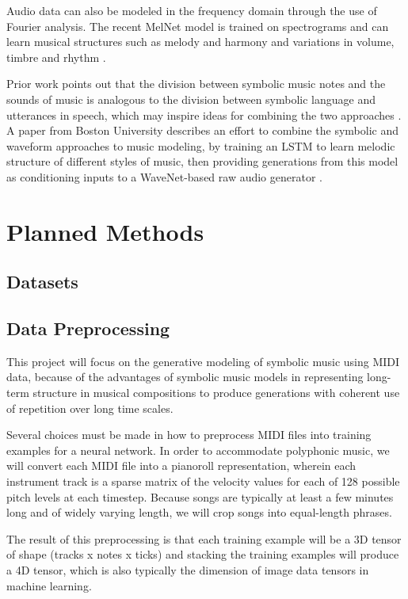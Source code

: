 \documentclass[sigconf,authorversion]{acmart}
\begin{document}
Audio data can also be modeled in the frequency domain through the use of
Fourier analysis. The recent MelNet model is trained on spectrograms and can
learn musical structures such as melody and harmony and variations in volume,
timbre and rhythm \cite{vasquez2019melnet}.

Prior work points out that the division between symbolic music notes and the
sounds of music is analogous to the division between symbolic language and
utterances in speech, which may inspire ideas for combining the two approaches
\cite{hawthorne2019enabling}. A paper from Boston University describes an effort
to combine the symbolic and waveform approaches to music modeling, by training
an LSTM to learn melodic structure of different styles of music, then providing
generations from this model as conditioning inputs to a WaveNet-based raw audio
generator \cite{manzelli_conditioning_2018}.

\section{Planned Methods}

\subsection{Datasets}

\subsection{Data Preprocessing}

This project will focus on the generative modeling of symbolic music using MIDI
data, because of the advantages of symbolic music models in representing
long-term structure in musical compositions to produce generations with coherent
use of repetition over long time scales.

Several choices must be made in how to preprocess MIDI files into training
examples for a neural network. In order to accommodate polyphonic music, we will
convert each MIDI file into a pianoroll representation, wherein each instrument
track is a sparse matrix of the velocity values for each of 128 possible pitch
levels at each timestep. Because songs are typically at least a few minutes long
and of widely varying length, we will crop songs into equal-length phrases.

The result of this preprocessing is that each training example will be a 3D
tensor of shape (tracks x notes x ticks) and stacking the training examples will
produce a 4D tensor, which is also typically the dimension of image data
tensors in machine learning.
\end{document}
